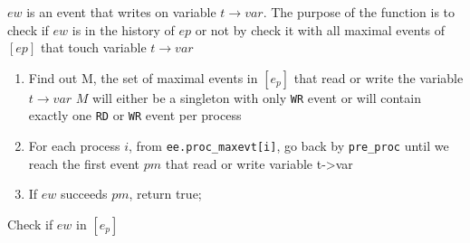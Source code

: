 \documentclass{llncs}
\begin{document}
\begin{algorithm}
$ew$ is an event that writes on variable $t \rightarrow var$. The purpose of the function is to check if $ew$ is in the history of $ep$ or not by check it with all maximal events of $[ep]$ that touch variable $t \rightarrow var$ 
\begin{enumerate}
\item
	Find out M, the set of maximal events in $[e_p]$ that read or write the variable $t \rightarrow var$
	$M$ will either be a singleton with only \verb!WR! event or will contain exactly one \verb!RD! or \verb!WR! event per
	process
\item
	For each process $i$, from \verb!ee.proc_maxevt[i]!, go back by \verb!pre_proc! until we reach the first event $pm$ 
	that read or write variable t->var
\item
	If $ew$ succeeds $pm$, return true;
\end{enumerate}

\label{a:pre_max}
\caption{Check if $ew$ in $[e_p]$ }
\end{algorithm}
\end{document}
